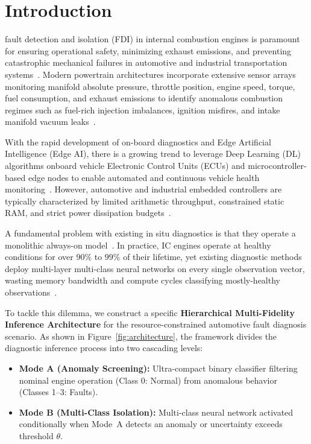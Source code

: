 \documentclass[journal]{IEEEtran}
\begin{document}
\maketitle
\IEEEdisplaynontitleabstractindextext

\section{Introduction}
 fault detection and isolation (FDI) in internal combustion engines is paramount for ensuring operational safety, minimizing exhaust emissions, and preventing catastrophic mechanical failures in automotive and industrial transportation systems~\cite{isermann2005model,aliramezani2022modeling,jia2016deep}. Modern powertrain architectures incorporate extensive sensor arrays monitoring manifold absolute pressure, throttle position, engine speed, torque, fuel consumption, and exhaust emissions to identify anomalous combustion regimes such as fuel-rich injection imbalances, ignition misfires, and intake manifold vacuum leaks~\cite{ahmed2015automotive,liu2018artificial,khan2018review}.

With the rapid development of on-board diagnostics and Edge Artificial Intelligence (Edge AI), there is a growing trend to leverage Deep Learning (DL) algorithms onboard vehicle Electronic Control Units (ECUs) and microcontroller-based edge nodes to enable automated and continuous vehicle health monitoring~\cite{saha2022tinyml,banbury2021benchmarking,warden2019tinyml}. However, automotive and industrial embedded controllers are typically characterized by limited arithmetic throughput, constrained static RAM, and strict power dissipation budgets~\cite{sze2017efficient,david2021tensorflow,han2016deep}.

A fundamental problem with existing in situ diagnostics is that they operate a monolithic always-on model~\cite{han2021dynamic}. In practice, IC engines operate at healthy conditions for over $90\%$ to $99\%$ of their lifetime, yet existing diagnostic methods deploy multi-layer multi-class neural networks on every single observation vector, wasting memory bandwidth and compute cycles classifying mostly-healthy observations~\cite{lei2020applications,sanchez2020tinyml}.

To tackle this dilemma, we construct a specific \textbf{Hierarchical Multi-Fidelity Inference Architecture} for the resource-constrained automotive fault diagnosis scenario. As shown in Figure~\ref{fig:architecture}, the framework divides the diagnostic inference process into two cascading levels:
\begin{itemize}
    \item \textbf{Mode A (Anomaly Screening):} Ultra-compact binary classifier filtering nominal engine operation (Class 0: Normal) from anomalous behavior (Classes 1--3: Faults).
    \item \textbf{Mode B (Multi-Class Isolation):} Multi-class neural network activated conditionally when Mode~A detects an anomaly or uncertainty exceeds threshold $\theta$.
\end{itemize}
\end{document}

